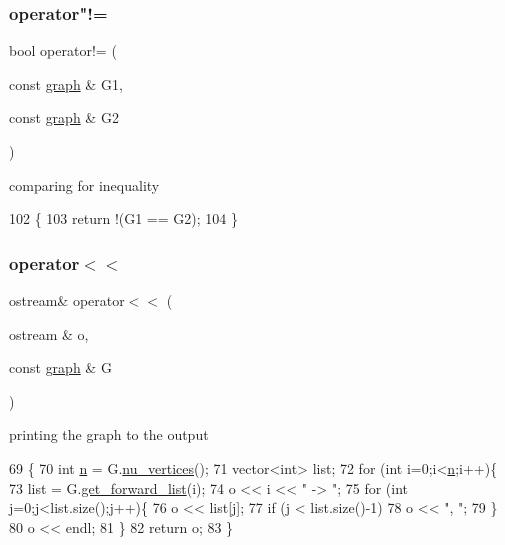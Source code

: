 \subsubsection{\texorpdfstring{operator"!=}{operator!=}}
{\footnotesize\ttfamily bool operator!= (\begin{DoxyParamCaption}\item[{const \hyperlink{classgraph}{graph} \&}]{G1,  }\item[{const \hyperlink{classgraph}{graph} \&}]{G2 }\end{DoxyParamCaption})\hspace{0.3cm}{\ttfamily [friend]}}



comparing for inequality 


\begin{DoxyCode}
102 \{
103   \textcolor{keywordflow}{return} !(G1 == G2);
104 \}
\end{DoxyCode}
\mbox{\label{classgraph_abe8832440fa24b6a6c152dbc3736c908}} 
\subsubsection{\texorpdfstring{operator$<$$<$}{operator<<}}
{\footnotesize\ttfamily ostream\& operator$<$$<$ (\begin{DoxyParamCaption}\item[{ostream \&}]{o,  }\item[{const \hyperlink{classgraph}{graph} \&}]{G }\end{DoxyParamCaption})\hspace{0.3cm}{\ttfamily [friend]}}



printing the graph to the output 


\begin{DoxyCode}
69 \{
70   \textcolor{keywordtype}{int} \hyperlink{classgraph_ac8b3474ce95c04087c312508ec1443b6}{n} = G.\hyperlink{classgraph_a70a6e0e4e0a874ab122405abd38f83cd}{nu\_vertices}();
71   vector<int> list;
72   \textcolor{keywordflow}{for} (\textcolor{keywordtype}{int} i=0;i<\hyperlink{classgraph_ac8b3474ce95c04087c312508ec1443b6}{n};i++)\{
73     list = G.\hyperlink{classgraph_aa8fbee52a7b3604dbbd9175040c7ead5}{get\_forward\_list}(i);
74     o << i << \textcolor{stringliteral}{" -> "};
75     \textcolor{keywordflow}{for} (\textcolor{keywordtype}{int} j=0;j<list.size();j++)\{
76       o << list[j];
77       \textcolor{keywordflow}{if} (j < list.size()-1)
78         o << \textcolor{stringliteral}{", "};
79     \}
80     o << endl;
81   \}
82   \textcolor{keywordflow}{return} o;
83 \}
\end{DoxyCode}
\mbox{\label{classgraph_a156c8acaca113a7e5cc8d918dd1fc3f3}} 
